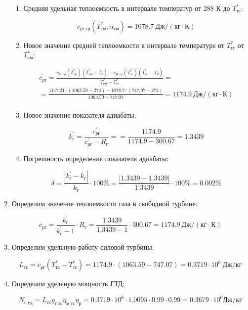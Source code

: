 \documentclass[a4paper,10pt]{article}
\begin{document}
\begin{enumerate}
\begin{enumerate}
		\item Средняя удельная теплоемкость в интервале температур от 288 К до $ T_{тс}^* $:
		
		\[
		c_{pг\ ср} (T_{см}^*, \alpha_{см}) = 1078.7\ Дж / (кг \cdot К)
		\]
		
		\item Новое значение средней теплоемкости в интервале температуре от $ T_{тc}^* $ от $ T_{см}^* $:
		
		\begin{gather*}
		    c_{pг}^\prime = \frac{
			c_{pг\ ср}(T_{см}^*) (T_{см}^* - T_0) - c_{pг\ ср}(T_{тс}^*) (T_{тс}^* - T_0)
		}{
			T_{см}^* - T_{тс}^*} =\\
		    = \frac{
			1117.21 \cdot (1063.59 - 273) -
			1078.7 \cdot (747.07 - 273)
		}{
			1063.59 - 747.07} =
			1174.9 \ Дж / (кг \cdot К)\\
		\end{gather*}
		
		\item Новое значение показателя адиабаты:
		
		\[
		k_{г}^\prime = \frac{ c_{pг}^\prime }{ c_{pг}^\prime - R_г } = 
				= \frac{ 1174.9 }{ 1174.9 - 300.67} =
				1.3439
		\]
		
		\item Погрешность определения показателя адиабаты:
		
		\[
		\delta = \frac{ \left| k_{г}^\prime - k_{г} \right| }{ k_{г} } \cdot 100 \% =
				\frac{ \left|  1.3439 - 1.3439 \right| }{ 1.3439 } \cdot 100 \% =
				0.002 \%
		\]
	
	\end{enumerate}
	
	\item Определим значение теплоемкости газа в свободной турбине:
	
	\[
	c_{pг} = \frac{ k_г^\prime }{ k_г^\prime - 1 } \cdot R_г = 
			\frac{ 1.3439 }{ 1.3439 - 1 } \cdot 300.67
			= 1174.9\ Дж/(кг \cdot К)
	\]
	
	\item Определим удельную работу силовой турбины:
	
	\[
	L_{тс} = c_{pг} ( T_{тк}^* -  T_{тс}^*) = 
		1174.9 \cdot ( 1063.59 -  747.07 ) = 
		0.3719 \cdot 10^6\ Дж/кг
	\]
	
	\item Определим удельную мощность ГТД:
	
	
	
	\[
	N_{e\ уд} = L_{тс} g_{г.тс} \eta_{м.тс} \eta_р = 
			0.3719 \cdot 10^6 \cdot 1.0095 \cdot 0.99 \cdot 0.99 =
	0.3679 \cdot 10^6 Дж/кг
	\]
	

\end{enumerate}
\end{document}
